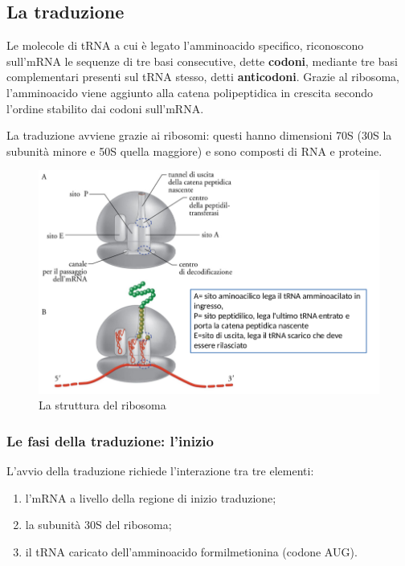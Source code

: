 \documentclass[11pt]{book}
\begin{document}
\subsection{La traduzione} 
Le molecole di tRNA a cui è legato l’amminoacido specifico, riconoscono sull’mRNA le sequenze di tre basi consecutive, dette \textbf{codoni}, mediante tre basi complementari presenti sul tRNA stesso, detti \textbf{anticodoni}. Grazie al ribosoma, l’amminoacido viene aggiunto alla catena polipeptidica in crescita secondo l’ordine stabilito dai codoni sull’mRNA.

La traduzione avviene grazie ai ribosomi: questi hanno dimensioni 70S (30S la subunità minore e 50S quella maggiore) e sono composti di RNA e proteine.

\clearpage
\begin{figure}[htp]
\centering
\includegraphics[scale=0.45]{img/Struttura ribosoma.png}
\caption{La struttura del ribosoma}
\label{}
\end{figure}

\subsubsection{Le fasi della traduzione: l'inizio} 
L’avvio della traduzione richiede l'interazione tra tre elementi: 
\begin{enumerate}
\item l'mRNA a livello della regione di inizio traduzione;
\item la subunità 30S del ribosoma;
\item il tRNA caricato dell’amminoacido formilmetionina (codone AUG).
\end{enumerate}
\end{document}
